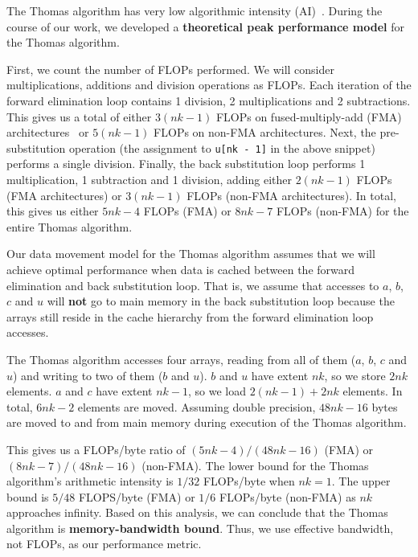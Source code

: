 \documentclass[10pt, conference, compsocconf]{IEEEtran}
\begin{document}
The Thomas algorithm has very low algorithmic intensity (AI)~\cite{roofline}.
During the course of our work, we developed a \textbf{theoretical peak
  performance model} for the Thomas algorithm.

First, we count the number of FLOPs performed.
We will consider multiplications, additions and division operations as FLOPs.
Each iteration of the forward elimination loop contains 1 division, 2
  multiplications and 2 subtractions.
This gives us a total of either \(3(nk-1)\) FLOPs on fused-multiply-add (FMA)
  architectures~\cite{intel_sw_dev_manual_2c} or 
  \(5(nk-1)\) FLOPs on non-FMA architectures.
Next, the pre-substitution operation (the assignment to \lstinline{u[nk - 1]}
  in the above snippet) performs a single division.
Finally, the back substitution loop performs 1 multiplication, 1
  subtraction and 1 division, adding either \(2(nk-1)\) FLOPs (FMA architectures)
  or \(3(nk-1)\) FLOPs (non-FMA architectures).
In total, this gives us either \(5nk-4\) FLOPs (FMA) or \(8nk-7\) FLOPs
  (non-FMA) for the entire Thomas algorithm.

Our data movement model for the Thomas algorithm assumes that we will achieve
  optimal performance when data is cached between the forward elimination and
  back substitution loop.
That is, we assume that accesses to \(a\), \(b\), \(c\) and \(u\) will
  \textbf{not} go to main memory in the back substitution loop because the
  arrays still reside in the cache hierarchy from the forward elimination loop
  accesses.

The Thomas algorithm accesses four arrays, reading from all of them (\(a\),
  \(b\), \(c\) and \(u\)) and writing to two of them (\(b\) and \(u\)).
\(b\) and \(u\) have extent \(nk\), so we store \(2nk\) elements.
\(a\) and \(c\) have extent \(nk-1\), so we load \(2(nk-1)+2nk\) elements.
In total, \(6nk-2\) elements are moved.
Assuming double precision, \(48nk-16\) bytes are moved to and from main memory
  during execution of the Thomas algorithm.

This gives us a FLOPs/byte ratio of \((5nk-4)/(48nk-16)\) (FMA) or
  \((8nk-7)/(48nk-16)\) (non-FMA).
The lower bound for the Thomas algorithm's arithmetic intensity is \(1/32\)
  FLOPs/byte when \(nk=1\). 
The upper bound is \(5/48\) FLOPS/byte (FMA) or \(1/6\) FLOPs/byte (non-FMA) as
  \(nk\) approaches infinity.
Based on this analysis, we can conclude that the Thomas algorithm is
  \textbf{memory-bandwidth bound}.
Thus, we use effective bandwidth, not FLOPs, as our performance metric.
\end{document}
